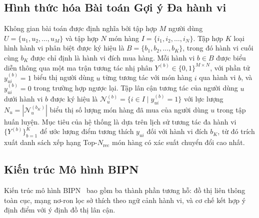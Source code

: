 \documentclass{llncs}
\begin{document}
\subsection{Hình thức hóa Bài toán Gợi ý Đa hành vi}
\label{sec:formulation}

Không gian bài toán được định nghĩa bởi tập hợp $M$ người dùng $U = \{u_1, u_2, \dots, u_M\}$ và tập hợp $N$ món hàng $I = \{i_1, i_2, \dots, i_N\}$. Tập hợp $K$ loại hình hành vi phân biệt được ký hiệu là $B = \{b_1, b_2, \dots, b_K\}$, trong đó hành vi cuối cùng $b_K$ được chỉ định là hành vi đích mua hàng. Mỗi hành vi $b \in B$ được biểu diễn thông qua một ma trận tương tác nhị phân $Y^{(b)} \in \{0, 1\}^{M \times N}$, với phần tử $y_{ui}^{(b)} = 1$ biểu thị người dùng $u$ từng tương tác với món hàng $i$ qua hành vi $b$, và $y_{ui}^{(b)} = 0$ trong trường hợp ngược lại. Tập lân cận tương tác của người dùng $u$ dưới hành vi $b$ được ký hiệu là $\mathcal{N}_u^{(b)} = \{i \in I \mid y_{ui}^{(b)} = 1\}$ với lực lượng $N_u = |\mathcal{N}_u^{(b_K)}|$ biểu thị số lượng món hàng đã mua của người dùng $u$ trong tập huấn luyện. Mục tiêu của hệ thống là dựa trên lịch sử tương tác đa hành vi $\{Y^{(b)}\}_{b=1}^K$ để ước lượng điểm tương thích $y_{ui}$ đối với hành vi đích $b_K$, từ đó trích xuất danh sách xếp hạng Top-$N_{\mathrm{rec}}$ món hàng có xác suất chuyển đổi cao nhất.

\subsection{Kiến trúc Mô hình BIPN}
\label{sec:bipn}

Kiến trúc mô hình BIPN~\cite{yan2024bipn} bao gồm ba thành phần tương hỗ: đồ thị liên thông toàn cục, mạng nơ-ron lọc sở thích theo ngữ cảnh hành vi, và cơ chế kết hợp ý định điểm với ý định đồ thị lân cận.
\end{document}
